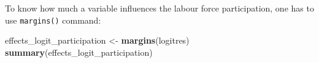 \documentclass[]{book}
\newenvironment{Shaded}{\begin{snugshade}}{\end{snugshade}}
\newcommand{\KeywordTok}[1]{\textcolor[rgb]{0.13,0.29,0.53}{\textbf{#1}}}
\newcommand{\NormalTok}[1]{#1}
\newcommand{\StringTok}[1]{\textcolor[rgb]{0.31,0.60,0.02}{#1}}
\begin{document}
To know how much a variable influences the labour force participation, one has to use \texttt{margins()} command:

\begin{Shaded}
\begin{Highlighting}[]
\NormalTok{effects_logit_participation <-}\StringTok{ }\KeywordTok{margins}\NormalTok{(logitres) }
\KeywordTok{summary}\NormalTok{(effects_logit_participation)}
\end{Highlighting}
\end{Shaded}

 
  \providecommand{\huxb}[2]{\arrayrulecolor[RGB]{#1}\global\arrayrulewidth=#2pt}
  \providecommand{\huxvb}[2]{\color[RGB]{#1}\vrule width #2pt}
  \providecommand{\huxtpad}[1]{\rule{0pt}{\baselineskip+#1}}
  \providecommand{\huxbpad}[1]{\rule[-#1]{0pt}{#1}}
\end{document}
